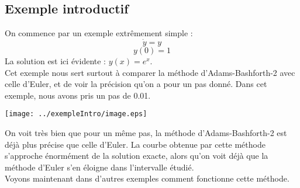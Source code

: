 \subsection{Exemple introductif}
On commence par un exemple extrêmement simple : 
\[\dot{y}=y\]
\[y(0)=1\]
La solution est ici évidente : $y(x)=e^x$. \\
Cet exemple nous sert surtout à comparer la méthode d'Adams-Bashforth-2 avec celle d'Euler, et de voir la précision qu'on a pour un pas donné. Dans cet exemple, nous avons pris un pas de 0.01.

\begin{center} \texttt{[image: ../exempleIntro/image.eps]} \end{center}

On voit très bien que pour un même pas, la méthode d'Adams-Bashforth-2 est déjà plus précise que celle d'Euler. La courbe obtenue par cette méthode s'approche énormément de la solution exacte, alors qu'on voit déjà que la méthode d'Euler s'en éloigne dans l'intervalle étudié.\\
Voyons maintenant dans d'autres exemples comment fonctionne cette méthode.
